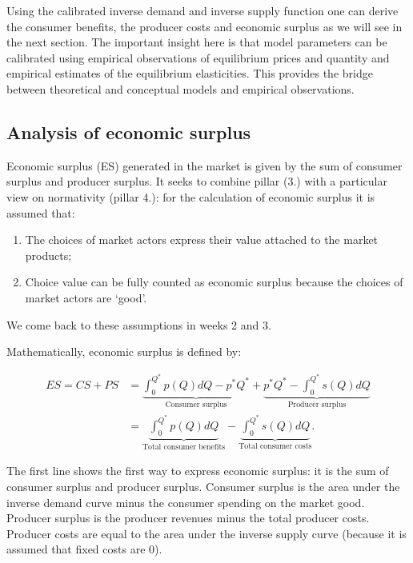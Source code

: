 \documentclass[
]{book}
\providecommand{\tightlist}{%
  \setlength{\itemsep}{0pt}\setlength{\parskip}{0pt}}
\begin{document}
Using the calibrated inverse demand and inverse supply function one can derive the consumer benefits, the producer costs and economic surplus as we will see in the next section. The important insight here is that model parameters can be calibrated using empirical observations of equilibrium prices and quantity and empirical estimates of the equilibrium elasticities. This provides the bridge between theoretical and conceptual models and empirical observations.

\hypertarget{analysis-of-economic-surplus-1}{%
\subsection{Analysis of economic surplus}\label{analysis-of-economic-surplus-1}}

Economic surplus (ES) generated in the market is given by the sum of consumer surplus and producer surplus. It seeks to combine pillar (3.) with a particular view on normativity (pillar 4.): for the calculation of economic surplus it is assumed that:

\begin{enumerate}
\def\labelenumi{\arabic{enumi}.}
\tightlist
\item
  The choices of market actors express their value attached to the market products;
\item
  Choice value can be fully counted as economic surplus because the choices of market actors are `good'.
\end{enumerate}

We come back to these assumptions in weeks 2 and 3.

Mathematically, economic surplus is defined by:

\begin{align}
ES = CS + PS &= \underbrace{\int_0^{Q^\ast} p(Q)dQ - p^\ast Q^\ast}_\text{Consumer surplus} + \underbrace{p^\ast Q^\ast - \int^{Q^\ast}_0 s(Q)dQ}_\text{Producer surplus}\\
&= \underbrace{\int_0^{Q^\ast} p(Q)dQ}_\text{Total consumer benefits} - \underbrace{\int^{Q^\ast}_0 s(Q)dQ}_\text{Total consumer costs}.
\end{align}

The first line shows the first way to express economic surplus: it is the sum of consumer surplus and producer surplus. Consumer surplus is the area under the inverse demand curve minus the consumer spending on the market good. Producer surplus is the producer revenues minus the total producer costs. Producer costs are equal to the area under the inverse supply curve (because it is assumed that fixed costs are 0).
\end{document}
